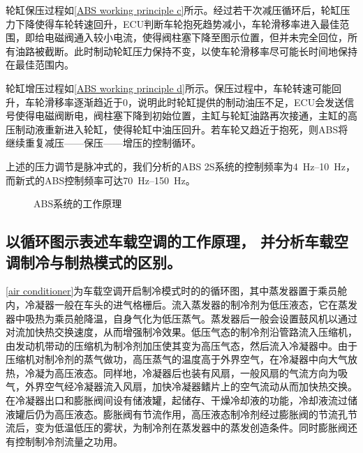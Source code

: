 \documentclass[UTF8]{ctexart}
\numberwithin{figure}{section}
\numberwithin{table}{section}
\begin{document}
轮缸保压过程如\cref{ABS working principle c}所示。经过若干次减压循环后，轮缸压力下降使得车轮转速回升，ECU判断车轮抱死趋势减小，车轮滑移率进入最佳范围，即给电磁阀通入较小电流，使得阀柱塞下降至图示位置，但并未完全回位，所有油路被截断。此时制动轮缸压力保持不变，以使车轮滑移率尽可能长时间地保持在最佳范围内。

轮缸增压过程如\cref{ABS working principle d}所示。保压过程中，车轮转速可能回升，车轮滑移率逐渐趋近于0，说明此时轮缸提供的制动油压不足，ECU会发送信号使得电磁阀断电，阀柱塞下降到初始位置，主缸与轮缸油路再次接通，主缸的高压制动液重新进入轮缸，使得轮缸中油压回升。若车轮又趋近于抱死，则ABS将继续重复减压——保压——增压的控制循环。

上述的压力调节是脉冲式的，我们分析的ABS 2S系统的控制频率为\qtyrange[range-phrase = $\,\sim\,$, range-units = single]{4}{10}{\Hz}，而新式的ABS控制频率可达\qtyrange[range-phrase = $\,\sim\,$, range-units = single]{70}{150}{\Hz}。

\begin{figure}[htbp]
	\centering
	\caption{ABS系统的工作原理}
	\label{ABS working principle}
\end{figure}

\subsection{以循环图示表述车载空调的工作原理， 并分析车载空调制冷与制热模式的区别。}

\cref{air conditioner}为车载空调开启制冷模式时的的循环图，其中蒸发器置于乘员舱内，冷凝器一般在车头的进气格栅后。流入蒸发器的制冷剂为低压液态，它在蒸发器中吸热为乘员舱降温，自身气化为低压蒸气。蒸发器后一般会设置鼓风机以通过对流加快热交换速度，从而增强制冷效果。低压气态的制冷剂沿管路流入压缩机，由发动机带动的压缩机为制冷剂加压使其变为高压气态，然后流入冷凝器中。由于压缩机对制冷剂的蒸气做功，高压蒸气的温度高于外界空气，在冷凝器中向大气放热，冷凝为高压液态。同样地，冷凝器后也装有风扇，一般风扇的气流方向为吸气，外界空气经冷凝器流入风扇，加快冷凝器鳍片上的空气流动从而加快热交换。在冷凝器出口和膨胀阀间设有储液罐，起储存、干燥冷却液的功能，冷却液流过储液罐后仍为高压液态。膨胀阀有节流作用，高压液态制冷剂经过膨胀阀的节流孔节流后，变为低温低压的雾状，为制冷剂在蒸发器中的蒸发创造条件。同时膨胀阀还有控制制冷剂流量之功用。
\end{document}
